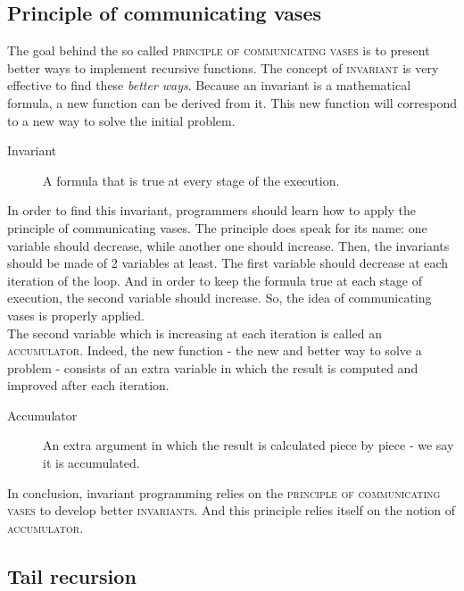 \documentclass[11pt,a4paper,twoside,openright]{report}
\begin{document}
\subsection{Principle of communicating vases}

The goal behind the so called \textsc{principle of communicating vases} is to 
present better ways to implement recursive functions. The concept of 
\textsc{invariant} is very effective to find these \textit{better ways}. 
Because an invariant is a mathematical formula, a new function can be derived 
from it. This new function will correspond to a new way to solve the initial 
problem.

\begin{description}
 \item[Invariant] A formula that is true at every stage of the execution.
\end{description}

In order to find this invariant, programmers should learn how to apply the 
principle of communicating vases. The principle does speak for its name: one 
variable should decrease, while another one should increase. Then, the 
invariants should be made of 2 variables at least. The first variable should 
decrease at each iteration of the loop. And in order to keep the formula true 
at 
each stage of execution, the second variable should increase. So, the idea of 
communicating vases is properly applied.\\

The second variable which is increasing at each iteration is called an 
\textsc{accumulator}. Indeed, the new function - the new and better way to 
solve 
a problem - consists of an extra variable in which the result is computed and 
improved after each iteration.

\begin{description}
 \item[Accumulator] An extra argument in which the result is calculated piece 
by piece - we say it is accumulated. 
\end{description}

In conclusion, invariant programming relies on the \textsc{principle of 
communicating vases} to develop better \textsc{invariants}. And this principle 
relies itself on the notion of \textsc{accumulator}.

\subsection{Tail recursion}
\end{document}
